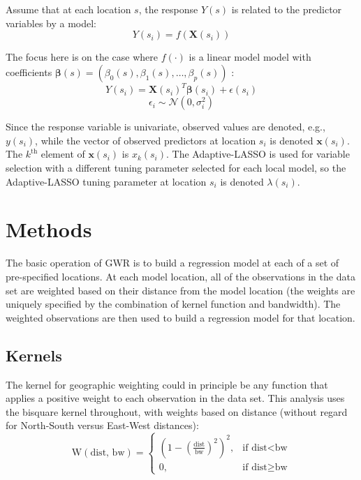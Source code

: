 \documentclass[authoryear, review, 11pt]{elsarticle}
\begin{document}
	Assume that at each location $s$, the response $Y(s)$ is related to the predictor variables by a model:\\
	
	\[
		Y(s_i) = f \left(\bm{X}(s_i) \right) %
	\]
	
	The focus here is on the case where $f(\cdot)$ is a linear model model with coefficients $\bm{\beta}(s) = (\beta_0(s), \beta_1(s), \dots, \beta_p(s))$ :\\
	\[
		Y(s_i) = \bm{X}(s_i)^T \bm{\beta}(s_i) + \epsilon(s_i)
	\]
	\[
		\epsilon_i \sim \bm{\mathcal{N}} \left( 0, \sigma_i^2 \right)
	\]
	
	Since the response variable is univariate, observed values are denoted, e.g., $y(s_i)$, while the vector of observed predictors at location $s_i$ is denoted $\bm{x}(s_i)$. The $k^{\text{th}}$ element of $\bm{x}(s_i)$ is $x_k(s_i)$. The Adaptive-LASSO is used for variable selection with a different tuning parameter selected for each local model, so the Adaptive-LASSO tuning parameter at location $s_i$ is denoted $\lambda(s_i)$.\\ 
	

\section{Methods}
	The basic operation of GWR is to build a regression model at each of a set of pre-specified locations. At each model location, all of the observations in the data set are weighted based on their distance from the model location (the weights are uniquely specified by the combination of kernel function and bandwidth). The weighted observations are then used to build a regression model for that location.\\
	
	\subsection{Kernels}
		The kernel for geographic weighting could in principle be any function that applies a positive weight to each observation in the data set. This analysis uses the bisquare kernel throughout, with weights based on distance (without regard for North-South versus East-West distances):
		\[
			\text{W}(\text{dist, bw}) = \begin{cases} (1-(\frac{\text{dist}}{\text{bw}})^2)^2, & \mbox{if dist} < \mbox{bw} \\
			0, & \mbox{if dist} \ge \mbox{bw} \end{cases}
		\]
		
\end{document}
